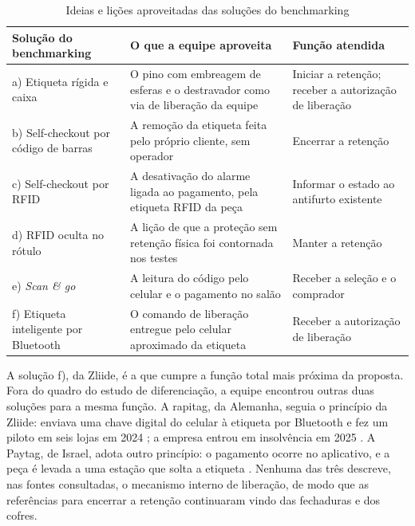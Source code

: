 \begin{table}[htbp]
    \centering
    \caption{Ideias e lições aproveitadas das soluções do benchmarking}
    \label{tab:aprov_benchmark}
    \footnotesize
    \renewcommand{\arraystretch}{1.3}
    \begin{tabularx}{\textwidth}{@{}
        >{\RaggedRight\arraybackslash}p{3.6cm}
        >{\RaggedRight\arraybackslash}X
        >{\RaggedRight\arraybackslash}p{3.6cm}@{}}
        \toprule
        \textbf{Solução do benchmarking} & \textbf{O que a equipe aproveita} & \textbf{Função atendida} \\
        \midrule
        a) Etiqueta rígida e caixa & O pino com embreagem de esferas e o destravador como via de liberação da equipe & Iniciar a retenção; receber a autorização de liberação \\
        b) Self-checkout por código de barras & A remoção da etiqueta feita pelo próprio cliente, sem operador & Encerrar a retenção \\
        c) Self-checkout por RFID & A desativação do alarme ligada ao pagamento, pela etiqueta RFID da peça & Informar o estado ao antifurto existente \\
        d) RFID oculta no rótulo & A lição de que a proteção sem retenção física foi contornada nos testes & Manter a retenção \\
        e) \textit{Scan \& go} & A leitura do código pelo celular e o pagamento no salão & Receber a seleção e o comprador \\
        f) Etiqueta inteligente por Bluetooth & O comando de liberação entregue pelo celular aproximado da etiqueta & Receber a autorização de liberação \\
        \bottomrule
    \end{tabularx}
\end{table}

A solução f), da Zliide, é a que cumpre a função total mais próxima da proposta. Fora do quadro do estudo de diferenciação, a equipe encontrou outras duas soluções para a mesma função. A rapitag, da Alemanha, seguia o princípio da Zliide: enviava uma chave digital do celular à etiqueta por Bluetooth e fez um piloto em seis lojas em 2024 \cite{eurocis2024rapitag}; a empresa entrou em insolvência em 2025 \cite{insolvenzradar2025rapitag}. A Paytag, de Israel, adota outro princípio: o pagamento ocorre no aplicativo, e a peça é levada a uma estação que solta a etiqueta \cite{calcalist2026paytag}. Nenhuma das três descreve, nas fontes consultadas, o mecanismo interno de liberação, de modo que as referências para encerrar a retenção continuaram vindo das fechaduras e dos cofres.

